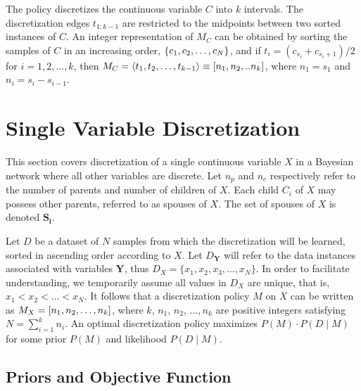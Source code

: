 \noindent
The policy discretizes the continuous variable $C$ into $k$ intervals.
The discretization edges $t_{1:k-1}$ are restricted to the midpoints between two sorted instances of $C$.
An integer representation of $M_C$ can be obtained by sorting the samples of $C$ in an increasing order, $\curly{c_1,c_2,\ldots,c_N}$, and if $t_i = (c_{s_{i}} + c_{s_{i}+1})/2$ for $i=1,2,\ldots,k$, then $M_C = \anglebrackets{t_1,t_2, \ldots, t_{k-1}} \equiv \brock{n_1,n_2,..n_k}$, where $n_1 = s_1$ and $n_i = s_{i} - s_{i-1}$.


\section{Single Variable Discretization}
\label{sec:single_var}

This section covers discretization of a single continuous variable $X$ in a Bayesian network where all other variables are discrete.
Let $n_p$ and $n_c$ respectively refer to the number of parents and number of children of $X$.
Each child $C_i$ of $X$ may possess other parents, referred to as spouses of $X$.
The set of spouses of $X$ is denoted $\boldsymbol{S_i}$.

Let $D$ be a dataset of $N$ samples from which the discretization will be learned, sorted in ascending order according to $X$.
Let $D_{\boldsymbol{Y}}$ will refer to the data instances associated with variables $\boldsymbol{Y}$, thus $D_X = \{ x_1,x_2,x_3,\ldots,x_N \}$.
In order to facilitate understanding, we temporarily assume all values in $D_X$ are unique, that is, $x_1 < x_2 < \ldots < x_N$.
It follows that a discretization policy $M$ on $X$ can be written as $M_X = \brock{n_1,n_2,\ldots,n_k}$, where $k$, $n_1$, $n_2$, $\ldots,n_k$ are positive integers satisfying $N = \sum_{i=1}^k n_i$.
An optimal discretization policy maximizes $P(M)\cdot P(D\mid M)$ for some prior $P(M)$ and likelihood $P(D\mid M)$.



\subsection{Priors and Objective Function}

